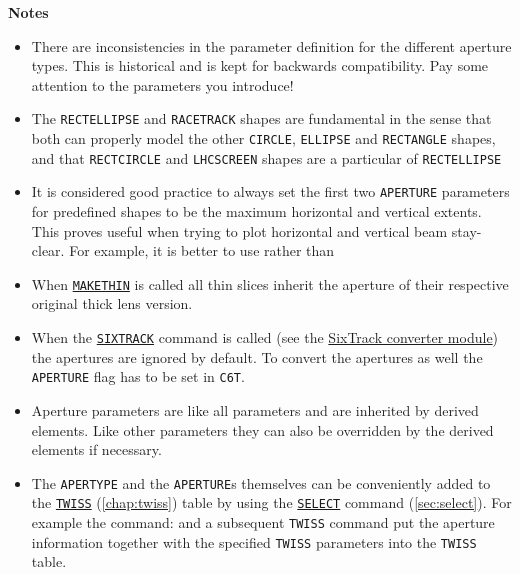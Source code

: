 \textbf{Notes}
\begin{itemize}
   \item There are inconsistencies in the parameter definition for the
     different aperture types. This is historical and is kept for
     backwards compatibility. Pay some attention to the parameters you
     introduce! 


	\item The \texttt{RECTELLIPSE}  and \texttt{RACETRACK} shapes are fundamental 
	in the sense that both can properly model the other \texttt{CIRCLE}, 
	\texttt{ELLIPSE} and \texttt{RECTANGLE} shapes, and that \texttt{RECTCIRCLE} 
	and \texttt{LHCSCREEN} shapes are a particular of \texttt{RECTELLIPSE}

	\item It is considered good practice to always set the first two 
	\texttt{APERTURE} parameters for predefined shapes to be the maximum
	horizontal and vertical extents. This proves useful when trying to 
	plot horizontal and vertical beam stay-clear. 
	For example, it is better to use
	rather than

   \item When \hyperref[chap:makethin]{\texttt{MAKETHIN}} is called all
     thin slices inherit the aperture of their respective original thick
     lens version.  

   \item When the \hyperref[chap:sixtrack]{\texttt{SIXTRACK}} command is called (see the
     \hyperref[chap:sixtrack]{SixTrack converter module}) the apertures are
     ignored by default. To convert the apertures as well the \texttt{APERTURE}
     flag has to be set in \texttt{C6T}.  

   \item  Aperture parameters are like all parameters and are inherited
     by derived elements. Like other parameters they can also be overridden by
     the derived elements if necessary.  

   \item The \texttt{APERTYPE} and the \texttt{APERTURE}s themselves can be
     conveniently added to the \hyperref[chap:twiss]{\texttt{TWISS}} 
     (\autoref{chap:twiss}) table by using the
     \hyperref[sec:select]{\texttt{SELECT}} command
     (\autoref{sec:select}). For example the command:     
     and a subsequent \texttt{TWISS} command put the aperture information together 
     with the specified \texttt{TWISS} parameters into the \texttt{TWISS} table.


\end{itemize}
